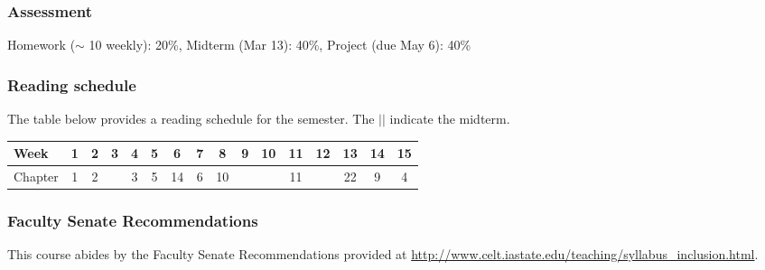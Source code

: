\documentclass[12pt]{article}
\begin{document}
\subsubsection*{Assessment}

Homework ($\sim$ 10 weekly): 20\%, Midterm (Mar 13): 40\%, Project (due May 6): 40\%

\subsubsection*{Reading schedule}

The table below provides a reading schedule for the semester. The $\vert\vert$ indicate the midterm. 

\vspace{0.2in} 

\begin{tabular}{|l|ccc|cccc|cc||c|ccccc|}
\hline
Week & 1 & 2 & 3 & 4 & 5 & 6 & 7 & 8 & 9 & 10 & 11 & 12 & 13 & 14 & 15 \\
\hline
Chapter & 1 & 2  & & 3 & 5& 14 & 6 & 10 &  &  & 11 &  & 22 & 9 & 4 \\
\hline
\end{tabular}

\subsubsection*{Faculty Senate Recommendations}

This course abides by the Faculty Senate Recommendations provided at \url{http://www.celt.iastate.edu/teaching/syllabus_inclusion.html}.
\end{document}
